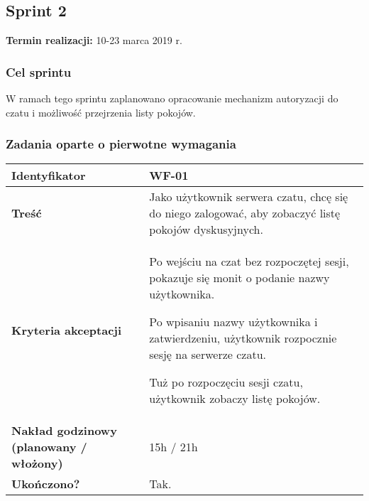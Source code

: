 \subsection{Sprint 2}

\textbf{Termin realizacji:} 10-23 marca 2019 r.

\subsubsection{Cel sprintu}
W ramach tego sprintu zaplanowano opracowanie mechanizm autoryzacji do czatu i
możliwość przejrzenia listy pokojów.

\subsubsection{Zadania oparte o pierwotne wymagania}

\leavevmode\hbox{}

\begin{tabular}{ | l | l | }
	\hline
		\textbf{Identyfikator} &
		WF-01
		\\

	\hline
		\textbf{Treść} & \parbox[t]{11.5cm}{\strut
			Jako użytkownik serwera czatu, chcę się do niego zalogować, aby zobaczyć listę pokojów dyskusyjnych.
		\strut}\\

	\hline
		\parbox[t]{4cm}{\textbf{Kryteria akceptacji}} & \parbox[t]{11.5cm}{\strut
			\begin{enumreq}
				\item Po wejściu na czat bez rozpoczętej sesji, pokazuje się monit o podanie nazwy użytkownika.
				\item Po wpisaniu nazwy użytkownika i zatwierdzeniu, użytkownik rozpocznie sesję na serwerze czatu.
				\item Tuż po rozpoczęciu sesji czatu, użytkownik zobaczy listę pokojów.
			\end{enumreq}
			\strut}
		\\

    \hline
      \parbox[t]{4cm}{\textbf{Nakład godzinowy (planowany / włożony)}} & \parbox[t]{11.5cm}{\strut
        15h / 21h
      \strut}\\
	\hline

    \hline
      \parbox[t]{4cm}{\textbf{Ukończono?}} &
      \parbox[t]{11.5cm}{\strut
        Tak.
      \strut}\\

      \hline
  \end{tabular}

